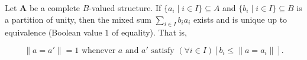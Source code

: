 Let $\mathbf{A}$ be a complete $B$-valued structure. If $\{a_i \mid i \in I\} \subseteq A$ and $\{b_i \mid i \in I\} \subseteq B$ is a partition of unity, then the mixed sum $\sum_{i \in I} b_i a_i$ exists and is unique up to equivalence (Boolean value $1$ of equality). That is,

$$\|a = a'\| = 1 \text{ whenever } a \text{ and } a' \text{ satisfy } (\forall i \in I)[b_i \leq \|a = a_i\|].$$

